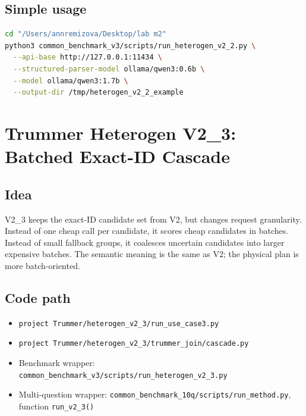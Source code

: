 \documentclass[11pt,oneside]{book}
\begin{document}
\section{Simple usage}
\begin{lstlisting}[language=bash]
cd "/Users/annremizova/Desktop/lab m2"
python3 common_benchmark_v3/scripts/run_heterogen_v2_2.py \
  --api-base http://127.0.0.1:11434 \
  --structured-parser-model ollama/qwen3:0.6b \
  --model ollama/qwen3:1.7b \
  --output-dir /tmp/heterogen_v2_2_example
\end{lstlisting}
\chapter{Trummer Heterogen V2\_3: Batched Exact-ID Cascade}
\section{Idea}
V2\_3 keeps the exact-ID candidate set from V2, but changes request granularity. Instead of one cheap call per candidate, it scores cheap candidates in batches. Instead of small fallback groups, it coalesces uncertain candidates into larger expensive batches. The semantic meaning is the same as V2; the physical plan is more batch-oriented.
\section{Code path}
\begin{itemize}
\item \texttt{project Trummer/heterogen\_v2\_3/run\_use\_case3.py}
\item \texttt{project Trummer/heterogen\_v2\_3/trummer\_join/cascade.py}
\item Benchmark wrapper: \texttt{common\_benchmark\_v3/scripts/run\_heterogen\_v2\_3.py}
\item Multi-question wrapper: \texttt{common\_benchmark\_10q/scripts/run\_method.py},
function \texttt{run\_v2\_3()}
\end{itemize}
\end{document}

